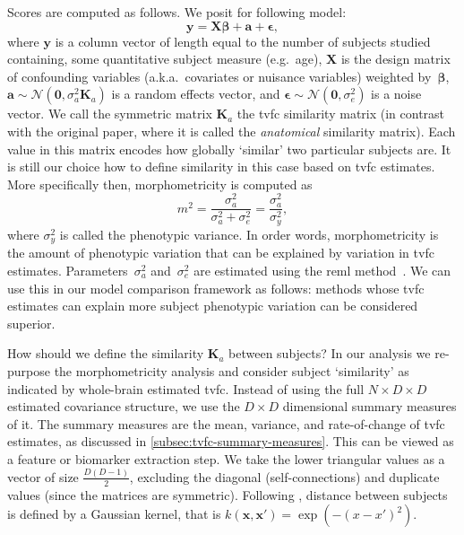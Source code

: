 Scores are computed as follows.
We posit for following model:
\begin{equation}
  \mathbf{y} = \mathbf{X} \mathbf{\beta} + \mathbf{a} + \mathbf{\epsilon},
  \label{eq:lme}
\end{equation}
where $\mathbf{y}$ is a column vector of length equal to the number of subjects studied containing, some quantitative subject measure (e.g.~age), $\mathbf{X}$ is the design matrix of confounding variables (a.k.a.~covariates or nuisance variables) weighted by~$\mathbf{\beta}$, $\mathbf{a}\sim \mathcal{N}(\mathbf{0}, \sigma_a^2 \mathbf{K}_a)$ is a random effects vector, and $\mathbf{\epsilon} \sim \mathcal{N}(\mathbf{0}, \sigma_e^2)$ is a noise vector.
We call the symmetric matrix $\mathbf{K}_a$ the \gls{tvfc} similarity matrix (in contrast with the original paper, where it is called the \emph{anatomical} similarity matrix).
Each value in this matrix encodes how globally `similar' two particular subjects are.
It is still our choice how to define similarity in this case based on \gls{tvfc} estimates.
More specifically then, morphometricity is computed as
\begin{equation}
  m^2 = \frac{\sigma_a^2}{\sigma_a^2 + \sigma_e^2} = \frac{\sigma_a^2}{\sigma_y^2},
\end{equation}
where $\sigma_y^2$ is called the phenotypic variance.
In order words, morphometricity is the amount of phenotypic variation that can be explained by variation in \gls{tvfc} estimates.
Parameters~$\sigma_a^2$ and~$\sigma_e^2$ are estimated using the \gls{reml} method~\parencite{Patterson1971, Harville1977}.
We can use this in our model comparison framework as follows: methods whose \gls{tvfc} estimates can explain more subject phenotypic variation can be considered superior.

How should we define the similarity $\mathbf{K}_a$ between subjects?
In our analysis we re-purpose the morphometricity analysis and consider subject `similarity' as indicated by whole-brain estimated \gls{tvfc}.
Instead of using the full $N \times D \times D$ estimated covariance structure, we use the $D \times D$ dimensional summary measures of it.
The summary measures are the mean, variance, and rate-of-change of \gls{tvfc} estimates, as discussed in \cref{subsec:tvfc-summary-measures}.
This can be viewed as a feature or biomarker extraction step.
We take the lower triangular values as a vector of size $\frac{D(D-1)}{2}$, excluding the diagonal (self-connections) and duplicate values (since the matrices are symmetric).
Following \textcite{Sabuncu2016}, distance between subjects is defined by a Gaussian kernel, that is $k(\textbf{x}, \textbf{x}') = \exp(-(x-x')^2)$.

